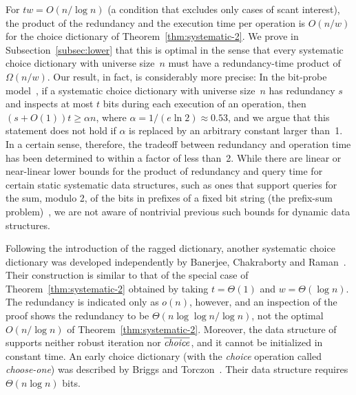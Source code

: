 \documentclass[envcountsame,envcountsect,undated,nolinenumbers]{lnthi}
\def\Tvn#1{\hbox{\textit{#1\/}}}
\begin{document}
For $t w=O({n/{\log n}})$ (a condition that excludes
only cases of scant interest),
the product of the redundancy
and the execution time per operation is $O({n/w})$
for the choice dictionary of Theorem~\ref{thm:systematic-2}.
We prove in Subsection~\ref{subsec:lower} that this is
optimal in the sense that every systematic choice
dictionary with universe size~$n$
must have a redundancy-time product of $\Omega({n/w})$.
Our result, in fact, is considerably more precise:
In the bit-probe model~\cite{GalM07,Yao81}, 
if a systematic choice dictionary with universe size~$n$
has redundancy $s$ and inspects at most $t$ bits during
each execution of an operation, then
$(s+O(1))t\ge\alpha n$, where
$\alpha={1/{(e\ln 2)}}\approx 0.53$, and
we argue that this statement
does not hold if $\alpha$ is replaced by an
arbitrary constant larger than~1.
In a certain sense, therefore, the tradeoff between
redundancy and operation time has been determined to within
a factor of less than~2.
While there are linear or near-linear lower bounds
for the product of redundancy and query time
for certain static systematic data structures,
such as ones that support queries
for the sum, modulo 2, of the bits in prefixes
of a fixed bit string
(the prefix-sum problem)~\cite{GalM07},
we are not aware of nontrivial previous such bounds
for dynamic data structures.

Following the introduction of the ragged dictionary,
another systematic choice dictionary was developed
independently by Banerjee,
Chakraborty and Raman~\cite{BanCR16}.
Their construction is similar to that of the
special case of Theorem~\ref{thm:systematic-2}
obtained by taking $t=\Theta(1)$ and $w=\Theta(\log n)$.
The redundancy is indicated only as $o(n)$,
however, and an inspection of the proof shows
the redundancy to be $\Theta({{n\log\log n}/{\log n}})$,
not the optimal $O({n/{\log n}})$ of
Theorem~\ref{thm:systematic-2}.
Moreover, the data structure of~\cite{BanCR16}
supports neither robust iteration nor
$\cchoice$, and it cannot be initialized
in constant time.
An early choice dictionary
(with the \Tvn{choice} operation called \Tvn{choose-one})
was described by Briggs and Torczon~\cite{BriT93}.
Their data structure requires $\Theta(n\log n)$ bits.
\end{document}
